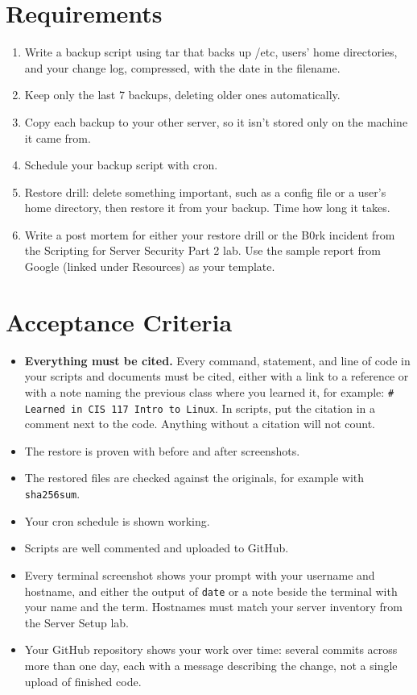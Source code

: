 \documentclass[12pt]{article}
\begin{document}
\section*{Requirements}
\begin{enumerate}
    \item Write a backup script using tar that backs up /etc, users' home directories, and your change log, compressed, with the date in the filename.
    \item Keep only the last 7 backups, deleting older ones automatically.
    \item Copy each backup to your other server, so it isn't stored only on the machine it came from.
    \item Schedule your backup script with cron.
    \item Restore drill: delete something important, such as a config file or a user's home directory, then restore it from your backup. Time how long it takes.
    \item Write a post mortem for either your restore drill or the B0rk incident from the Scripting for Server Security Part 2 lab. Use the sample report from Google (linked under Resources) as your template.
\end{enumerate}

\section*{Acceptance Criteria}
\begin{itemize}
    \item \textbf{Everything must be cited.} Every command, statement, and line of code in your scripts and documents must be cited, either with a link to a reference or with a note naming the previous class where you learned it, for example: \texttt{\# Learned in CIS 117 Intro to Linux}. In scripts, put the citation in a comment next to the code. Anything without a citation will not count.
    \item The restore is proven with before and after screenshots.
    \item The restored files are checked against the originals, for example with \texttt{sha256sum}.
    \item Your cron schedule is shown working.
    \item Scripts are well commented and uploaded to GitHub.
    \item Every terminal screenshot shows your prompt with your username and hostname, and either the output of \texttt{date} or a note beside the terminal with your name and the term. Hostnames must match your server inventory from the Server Setup lab.
    \item Your GitHub repository shows your work over time: several commits across more than one day, each with a message describing the change, not a single upload of finished code.
\end{itemize}
\end{document}
